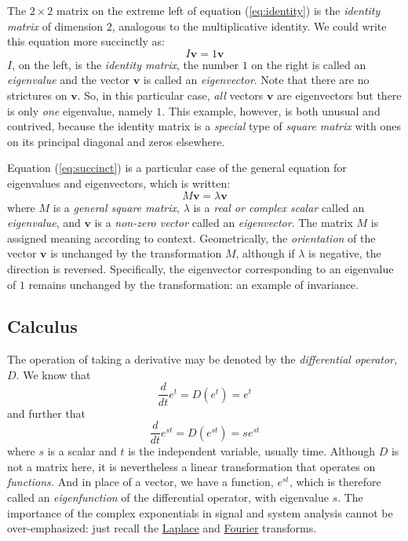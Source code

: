 \documentclass[
  12pt,
  a4paper,
]{article}
\begin{document}
The \(2 \times 2\) matrix on the extreme left of equation
(\ref{eq:identity}) is the \emph{identity matrix} of dimension \(2\),
analogous to the multiplicative identity. We could write this equation
more succinctly as: \begin{equation}
I\boldsymbol{v} = 1\boldsymbol{v}
\label{eq:succinct}\end{equation} \(I\), on the left, is the
\emph{identity matrix}, the number \(1\) on the right is called an
\emph{eigenvalue} and the vector \(\boldsymbol{v}\) is called an
\emph{eigenvector}. Note that there are no strictures on
\(\boldsymbol{v}\). So, in this particular case, \emph{all} vectors
\(\boldsymbol{v}\) are eigenvectors but there is only \emph{one}
eigenvalue, namely \(1\). This example, however, is both unusual and
contrived, because the identity matrix is a \emph{special} type of
\emph{square matrix} with ones on its principal diagonal and zeros
elsewhere.

Equation (\ref{eq:succinct}) is a particular case of the general
equation for eigenvalues and eigenvectors, which is written:
\begin{equation}
M\boldsymbol{v} = \lambda \boldsymbol{v}
\label{eq:eigen}\end{equation} where \(M\) is a \emph{general square
matrix}, \({\lambda}\) is a \emph{real or complex scalar} called an
\emph{eigenvalue}, and \(\boldsymbol{v}\) is a \emph{non-zero vector}
called an \emph{eigenvector}. The matrix \(M\) is assigned meaning
according to context. Geometrically, the \emph{orientation} of the
vector \(\boldsymbol{v}\) is unchanged by the transformation \(M\),
although if \(\lambda\) is negative, the direction is reversed.
Specifically, the eigenvector corresponding to an eigenvalue of \(1\)
remains unchanged by the transformation: an example of invariance.

\hypertarget{calculus}{%
\subsection{Calculus}\label{calculus}}

The operation of taking a derivative may be denoted by the
\emph{differential operator,} \(D\). We know that \[
\frac{d}{dt}e^{t} = D(e^{t}) = e^{t}
\] and further that \[
\frac{d}{dt}e^{st} = D(e^{st}) = se^{st}
\] where \(s\) is a scalar and \(t\) is the independent variable,
usually time. Although \(D\) is not a matrix here, it is nevertheless a
linear transformation that operates on \emph{functions.} And in place of
a vector, we have a function, \(e^{st}\), which is therefore called an
\emph{eigenfunction} of the differential operator, with eigenvalue
\(s\). The importance of the complex exponentials in signal and system
analysis cannot be over-emphasized: just recall the
\href{https://en.wikipedia.org/wiki/Laplace_transform}{Laplace} and
\href{https://en.wikipedia.org/wiki/Fourier_transform}{Fourier}
transforms.
\end{document}
